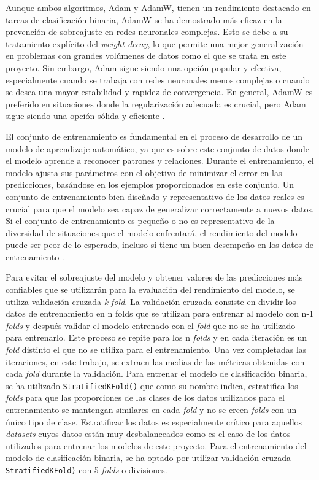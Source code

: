 Aunque ambos algoritmos, Adam y AdamW, tienen un rendimiento destacado en tareas de clasificación binaria, AdamW se ha demostrado más eficaz en la prevención de sobreajuste en redes neuronales complejas. Esto se debe a su tratamiento explícito del \textit{weight decay}, lo que permite una mejor generalización en problemas con grandes volúmenes de datos como el que se trata en este proyecto. Sin embargo, Adam sigue siendo una opción popular y efectiva, especialmente cuando se trabaja con redes neuronales menos complejas o cuando se desea una mayor estabilidad y rapidez de convergencia. En general, AdamW es preferido en situaciones donde la regularización adecuada es crucial, pero Adam sigue siendo una opción sólida y eficiente \cite{kingma2014adam}.

El conjunto de entrenamiento es fundamental en el proceso de desarrollo de un modelo de aprendizaje automático, ya que es sobre este conjunto de datos donde el modelo aprende a reconocer patrones y relaciones. Durante el entrenamiento, el modelo ajusta sus parámetros con el objetivo de minimizar el error en las predicciones, basándose en los ejemplos proporcionados en este conjunto. Un conjunto de entrenamiento bien diseñado y representativo de los datos reales es crucial para que el modelo sea capaz de generalizar correctamente a nuevos datos. Si el conjunto de entrenamiento es pequeño o no es representativo de la diversidad de situaciones que el modelo enfrentará, el rendimiento del modelo puede ser peor de lo esperado, incluso si tiene un buen desempeño en los datos de entrenamiento  \cite{bishop2006pattern}.

Para evitar el sobreajuste del modelo y obtener valores de las predicciones más confiables que se utilizarán para la evaluación del rendimiento del modelo, se utiliza validación cruzada \textit{k-fold}. La validación cruzada consiste en dividir los datos de entrenamiento en n folds que se utilizan para entrenar al modelo con n-1 \textit{folds} y después validar el modelo entrenado con el \textit{fold} que no se ha utilizado para entrenarlo. Este proceso se repite para los n \textit{folds} y en cada iteración es un \textit{fold} distinto el que no se utiliza para el entrenamiento. Una vez completadas las iteraciones, en este trabajo, se extraen las medias de las métricas obtenidas con cada \textit{fold} durante la validación. Para entrenar el modelo de clasificación binaria, se ha utilizado \texttt{StratifiedKFold()} que como su nombre indica, estratifica los \textit{folds} para que las proporciones de las clases de los datos utilizados para el entrenamiento se mantengan similares en cada \textit{fold} y no se creen \textit{folds} con un único tipo de clase. Estratificar los datos es especialmente crítico para aquellos \textit{datasets} cuyos datos están muy desbalanceados como es el caso de los datos utilizados para entrenar los modelos de este proyecto. Para el entrenamiento del modelo de clasificación binaria, se ha optado por utilizar validación cruzada \texttt{StratifiedKFold)} con 5 \textit{folds} o divisiones.


